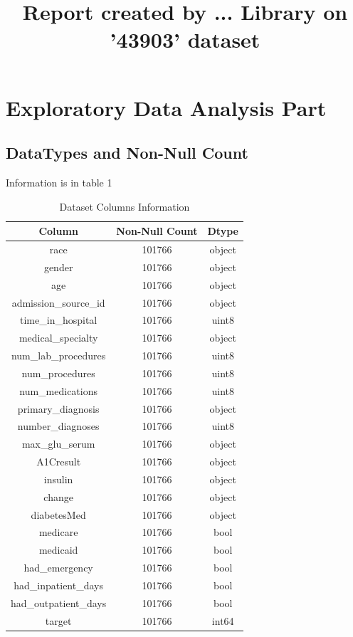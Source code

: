 \documentclass{article}%
\title{Report created by ... Library on '43903' dataset}%
\begin{document}
%
\normalsize%
\maketitle%
\section{Exploratory Data Analysis Part}%
\label{sec:ExploratoryDataAnalysisPart}%
\subsection{DataTypes and Non{-}Null Count}%
\label{subsec:DataTypesandNon{-}NullCount}%
Information is in table 1%


\begin{table}[h!]%
\caption{Dataset Columns Information}%
\vspace{0.2cm}%
\centering%
\begin{tabular}{|c|c|c|}%
\hline%
Column&Non{-}Null Count&Dtype\\%
\hline%
race&101766&object\\%
gender&101766&object\\%
age&101766&object\\%
admission\_source\_id&101766&object\\%
time\_in\_hospital&101766&uint8\\%
medical\_specialty&101766&object\\%
num\_lab\_procedures&101766&uint8\\%
num\_procedures&101766&uint8\\%
num\_medications&101766&uint8\\%
primary\_diagnosis&101766&object\\%
number\_diagnoses&101766&uint8\\%
max\_glu\_serum&101766&object\\%
A1Cresult&101766&object\\%
insulin&101766&object\\%
change&101766&object\\%
diabetesMed&101766&object\\%
medicare&101766&bool\\%
medicaid&101766&bool\\%
had\_emergency&101766&bool\\%
had\_inpatient\_days&101766&bool\\%
had\_outpatient\_days&101766&bool\\%
target&101766&int64\\%
\hline%
\end{tabular}%
\end{table}
\end{document}
